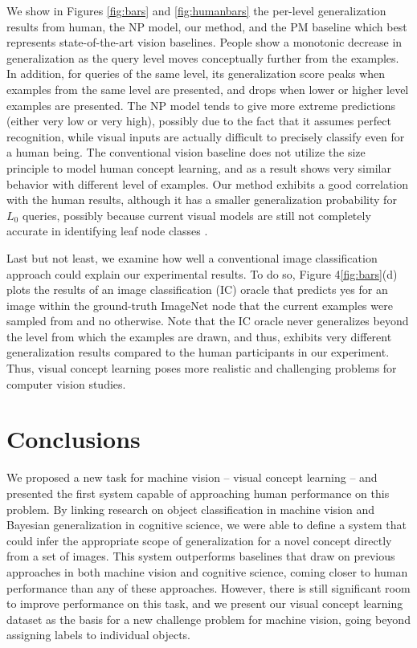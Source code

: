 We show in Figures \ref{fig:bars} and \ref{fig:humanbars} the per-level generalization results from human, the NP model, our method, and the PM baseline which best represents state-of-the-art vision baselines. People show a monotonic decrease in generalization as the query level moves conceptually further from the examples. In addition, for queries of the same level, its generalization score peaks when examples from the same level are presented, and drops when lower or higher level examples are presented. The NP model tends to give more extreme predictions (either very low or very high), possibly due to the fact that it assumes perfect recognition, while visual inputs are actually difficult to precisely classify even for a human being. The conventional vision baseline does not utilize the size principle to model human concept learning, and as a result shows very similar behavior with different level of examples. Our method exhibits a good correlation with the human results, although it has a smaller generalization probability for $L_0$ queries, possibly because current visual models are still not completely accurate in identifying leaf node classes \cite{deng2012hedging}.

Last but not least, we examine how well a conventional image classification approach could explain our experimental results. To do so, Figure 4\ref{fig:bars}(d) plots the results of an image classification (IC) oracle that predicts yes for an image within the ground-truth ImageNet node that the current examples were sampled from and no otherwise. Note that the IC oracle never generalizes beyond the level from which the examples are drawn, and thus, exhibits very different generalization results compared to the human participants in our experiment. Thus, visual concept learning poses more realistic and challenging problems for computer vision studies.


\vspace{-0.05in}
\section{Conclusions}\vspace{-0.05in}

We proposed a new task for machine vision -- visual
concept learning -- and presented the first system capable of approaching
human performance on this problem. By linking research on object
classification in machine vision and Bayesian generalization in cognitive
science, we were able to define a system that could infer the appropriate
scope of generalization for a novel concept directly from a set of
images. This system outperforms baselines that draw on previous approaches
in both machine vision and cognitive science, coming closer to human
performance than any of these approaches. However, there is still
significant room to improve performance on this task, and we present our
visual concept learning dataset as the basis for a new challenge problem
for machine vision, going beyond assigning labels to individual objects.

